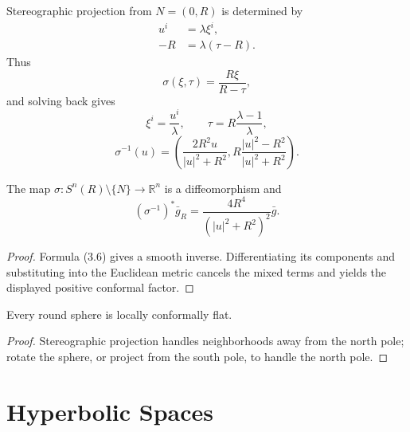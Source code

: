 Stereographic projection from $N=(0,R)$ is determined by
\begin{align*}
u^i&=\lambda\xi^i,\\
-R&=\lambda(\tau-R).
\tag{3.3}
\end{align*}
Thus
\begin{equation}
\sigma(\xi,\tau)=\frac{R\xi}{R-\tau},\tag{3.4}
\end{equation}
and solving back gives
\begin{equation}
\xi^i=\frac{u^i}{\lambda},\qquad \tau=R\frac{\lambda-1}{\lambda},\tag{3.5}
\end{equation}
\begin{equation}
\sigma^{-1}(u)=\left(\frac{2R^2u}{|u|^2+R^2},R\frac{|u|^2-R^2}{|u|^2+R^2}\right).\tag{3.6}
\end{equation}

\begin{proposition}
\label{prop:stereographic-conformal-diffeomorphism}
The map $\sigma:S^n(R)\setminus\{N\}\to\mathbb R^n$ is a diffeomorphism and
\[
(\sigma^{-1})^*\bar g_R=\frac{4R^4}{(|u|^2+R^2)^2}\bar g.
\]
\end{proposition}
\begin{proof}
\sketch Formula (3.6) gives a smooth inverse. Differentiating its components and substituting into the Euclidean metric cancels the mixed terms and yields the displayed positive conformal factor.
\end{proof}

\begin{corollary}
\label{cor:sphere-round-metric-locally-conformally-flat}

Every round sphere is locally conformally flat.
\end{corollary}
\begin{proof}
\sketch Stereographic projection handles neighborhoods away from the north pole; rotate the sphere, or project from the south pole, to handle the north pole.
\end{proof}

\section{Hyperbolic Spaces}

